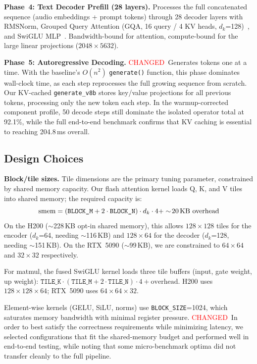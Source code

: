 \documentclass{article}
\newcommand{\chg}[1]{{\color{blue}#1}}
\newcommand{\chglabel}{{\setlength{\fboxsep}{1pt}\colorbox{yellow!45}{\textcolor{red}{\scriptsize CHANGED}}}}
\begin{document}
\textbf{Phase~4: Text Decoder Prefill (28 layers).}
Processes the full concatenated sequence (audio embeddings + prompt tokens) through 28 decoder layers with RMSNorm, Grouped Query Attention (GQA, 16 query / 4 KV heads, $d_k$=128)~\citep{ainslie2023gqa}, and SwiGLU MLP~\citep{shazeer2020glu}.  Bandwidth-bound for attention, compute-bound for the large linear projections ($2048 \times 5632$).

\textbf{Phase~5: Autoregressive Decoding.}
\chglabel\ \chg{Generates tokens one at a time.  With the baseline's $O(n^2)$ \texttt{generate()} function, this phase dominates wall-clock time, as each step reprocesses the full growing sequence from scratch.  Our KV-cached \texttt{generate\_v8b} stores key/value projections for all previous tokens, processing only the new token each step.  In the warmup-corrected component profile, 50 decode steps still dominate the isolated operator total at 92.1\%, while the full end-to-end benchmark confirms that KV caching is essential to reaching 204.8\,ms overall.}

\subsection{Design Choices}

\textbf{Block/tile sizes.}
Tile dimensions are the primary tuning parameter, constrained by shared memory capacity.  Our flash attention kernel loads Q, K, and V tiles into shared memory; the required capacity is:
\begin{equation}
\text{smem} = (\texttt{BLOCK\_M} + 2 \cdot \texttt{BLOCK\_N}) \cdot d_k \cdot 4 + \sim\!20\text{\,KB overhead}
\label{eq:smem}
\end{equation}
On the H200 ($\sim$228\,KB opt-in shared memory), this allows $128 \times 128$ tiles for the encoder ($d_k$=64, needing $\sim$116\,KB) and $128 \times 64$ for the decoder ($d_k$=128, needing $\sim$151\,KB).  On the RTX~5090 ($\sim$99\,KB), we are constrained to $64 \times 64$ and $32 \times 32$ respectively.

For matmul, the fused SwiGLU kernel loads three tile buffers (input, gate weight, up weight): $\texttt{TILE\_K} \cdot (\texttt{TILE\_M} + 2 \cdot \texttt{TILE\_N}) \cdot 4 + \text{overhead}$.  H200 uses $128 \times 128 \times 64$; RTX~5090 uses $64 \times 64 \times 32$.

Element-wise kernels (GELU, SiLU, norms) use \texttt{BLOCK\_SIZE}=1024, which saturates memory bandwidth with minimal register pressure.
\chglabel\ \chg{In order to best satisfy the correctness requirements while minimizing latency, we selected configurations that fit the shared-memory budget and performed well in end-to-end testing, while noting that some micro-benchmark optima did not transfer cleanly to the full pipeline.}
\end{document}
